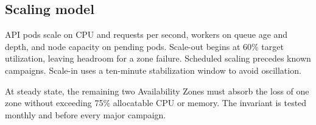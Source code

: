 \subsection{Scaling model}

API pods scale on CPU and requests per second, workers on queue age and depth, and node capacity on pending pods. Scale-out begins at 60\% target utilization, leaving headroom for a zone failure. Scheduled scaling precedes known campaigns. Scale-in uses a ten-minute stabilization window to avoid oscillation.

\begin{summarybox}
At steady state, the remaining two Availability Zones must absorb the loss of one zone without exceeding 75\% allocatable CPU or memory. The invariant is tested monthly and before every major campaign.
\end{summarybox}

